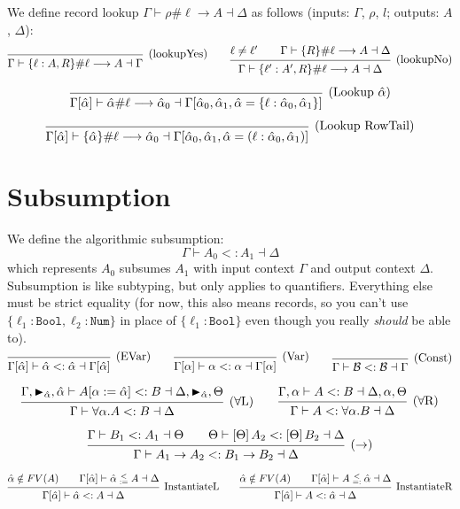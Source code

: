 \documentclass{article}
\newcommand{\B}{\mathcal{B}}
\newcommand{\marker}[1]{\RHD_{#1}}
\newcommand{\subsume}{<:}
\newcommand{\instLSymbol}{\;\substack{<\\:=}\;}
\newcommand{\instRSymbol}{\;\substack{<\\=:}\;}
\newcommand{\ev}{\hat}
\newcommand{\spc}{\qquad}
\newcommand{\apply}[1]{\left[#1\right]}
\newcommand{\subsumes}[4]{#1 \vdash #2 \subsume #3 \dashv #4}
\newcommand{\instL}[4]{#1 \vdash #2 \instLSymbol #3 \dashv #4}
\newcommand{\instR}[4]{#1 \vdash #2 \instRSymbol #3 \dashv #4}
\newcommand{\lookup}[5]{#1 \vdash #2 \# #3 \longrightarrow #4 \dashv #5}
\newcommand{\deduct}[3][]
{
  \begin{prooftree}
    \hypo{#2}
    \infer1[\text{#1}]{#3}
  \end{prooftree}
}
\begin{document}
\noindent
We define record lookup $\lookup{\Gamma}{\rho}{\ell}{A}{\Delta}$ as follows (inputs: $\Gamma$, $\rho$, $l$; outputs: $A$, $\Delta$):
\[
\deduct[(lookupYes)]{}{\lookup{\Gamma}{\{\ell : A, R\}}{\ell}{A}{\Gamma}}
\spc
\deduct[(lookupNo)]
  {\ell \neq \ell' \spc \lookup{\Gamma}{\{R\}}{\ell}{A}{\Delta}}
  {\lookup{\Gamma}{\{\ell' : A', R\}}{\ell}{A}{\Delta}}
\]

\[
\deduct[(Lookup \(\ev\alpha\))]
  { }
  { \lookup
      {\Gamma[\ev\alpha]}
      {\ev\alpha}
      {\ell}
      {\ev\alpha_0}
      {\Gamma[\ev\alpha_0, \ev\alpha_1, \ev\alpha = \{\ell : \ev\alpha_0, \ev\alpha_1\}] }
  }
\]

\[
\deduct[(Lookup RowTail)]
  { }
  { \lookup
      {\Gamma[\ev\alpha]}
      {\{\ev\alpha\}}
      {\ell}
      {\ev\alpha_0}
      {\Gamma[\ev\alpha_0, \ev\alpha_1, \ev\alpha = (\ell : \ev\alpha_0, \ev\alpha_1)] }
  }
\]

\section{Subsumption}
We define the algorithmic subsumption:
\[
\subsumes{\Gamma}{A_0}{A_1}{\Delta}
\]
which represents $A_0$ subsumes $A_1$ with input context $\Gamma$ and output
context $\Delta$. Subsumption is like subtyping, but only applies to
quantifiers. Everything else must be strict equality (for now, this also means
records, so you can't use \(\{\ell_1: \texttt{Bool}, \ell_2: \texttt{Num}\}\) in
place of \(\{\ell_1 : \texttt{Bool}\}\) even though you really \emph{should} be
able to).
\[
  \deduct[(EVar)]{}{\subsumes{\Gamma[\ev\alpha]}{\ev\alpha}{\ev\alpha}{\Gamma[\ev\alpha]}}
  \spc
  \deduct[(Var)]{}{\subsumes{\Gamma[\alpha]}{\alpha}{\alpha}{\Gamma[\alpha]}}
  \spc
  \deduct[(Const)]{}{\subsumes{\Gamma}{\B}{\B}{\Gamma}}
\]

\[
  \deduct[(\(\forall\)L)]
  { \subsumes{\Gamma, \marker{\ev\alpha}, \ev\alpha}{A[\alpha := \ev\alpha]}{B}{\Delta, \marker{\ev\alpha}, \Theta} }
  { \subsumes{\Gamma}{\forall \alpha. A}{B}{\Delta} }
  \spc
  \deduct[(\(\forall\)R)]
  { \subsumes{\Gamma, \alpha}{A}{B}{\Delta, \alpha, \Theta} }
  { \subsumes{\Gamma}{A}{\forall \alpha. B}{\Delta} }
\]

\[
  \deduct[(\(\to\))]
  { \subsumes{\Gamma}{B_1}{A_1}{\Theta} \spc \subsumes{\Theta}{\apply\Theta A_2}{\apply\Theta B_2}{\Delta} }
  { \subsumes{\Gamma}{A_1 \to A_2}{B_1 \to B_2}{\Delta} }
\]

\[
  \deduct[InstantiateL]
  {\ev \alpha \notin FV(A) \spc \instL{\Gamma[\ev \alpha]}{\ev
      \alpha}{A}{\Delta}}
  {\subsumes{\Gamma[\ev \alpha]}{\ev \alpha}{A}{\Delta}}
  \spc
  \deduct[InstantiateR]
  {\ev \alpha \notin FV(A) \spc \instR{\Gamma[\ev \alpha]}{A}{\ev
      \alpha}{\Delta}}
  {\subsumes{\Gamma[\ev \alpha]}{A}{\ev \alpha}{\Delta}}
\]
\end{document}
